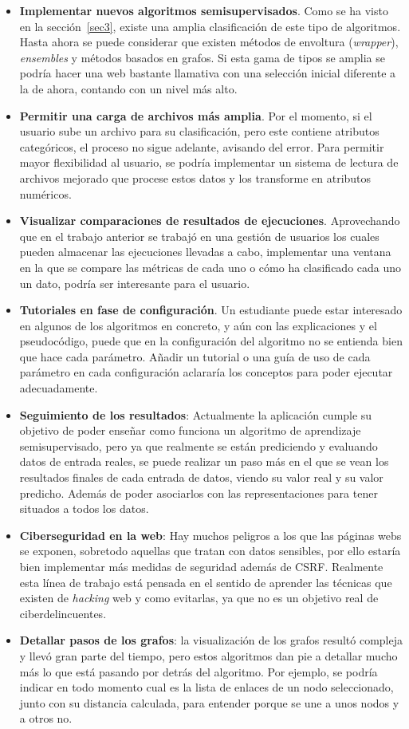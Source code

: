 \begin{itemize}
	\item \textbf{Implementar nuevos algoritmos semisupervisados}. Como se ha visto en la sección~\ref{sec3}, existe una amplia clasificación de este tipo de algoritmos. Hasta ahora se puede considerar que existen métodos de envoltura (\textit{wrapper}), \textit{ensembles} y métodos basados en grafos. Si esta gama de tipos se amplia se podría hacer una web bastante llamativa con una selección inicial diferente a la de ahora, contando con un nivel más alto.
	\item \textbf{Permitir una carga de archivos más amplia}. Por el momento, si el usuario sube un archivo para su clasificación, pero este contiene atributos categóricos, el proceso no sigue adelante, avisando del error. Para permitir mayor flexibilidad al usuario, se podría implementar un sistema de lectura de archivos mejorado que procese estos datos y los transforme en atributos numéricos.
	\item \textbf{Visualizar comparaciones de resultados de ejecuciones}. Aprovechando que en el trabajo anterior se trabajó en una gestión de usuarios los cuales pueden almacenar las ejecuciones llevadas a cabo, implementar una ventana en la que se compare las métricas de cada uno o cómo ha clasificado cada uno un dato, podría ser interesante para el usuario.
	\item \textbf{Tutoriales en fase de configuración}. Un estudiante puede estar interesado en algunos de los algoritmos en concreto, y aún con las explicaciones y el pseudocódigo, puede que en la configuración del algoritmo no se entienda bien que hace cada parámetro. Añadir un tutorial o una guía de uso de cada parámetro en cada configuración aclararía los conceptos para poder ejecutar adecuadamente.
	\item \textbf{Seguimiento de los resultados}: Actualmente la aplicación cumple su objetivo de poder enseñar como funciona un algoritmo de aprendizaje semisupervisado, pero ya que realmente se están prediciendo y evaluando datos de entrada reales, se puede realizar un paso más en el que se vean los resultados finales de cada entrada de datos, viendo su valor real y su valor predicho. Además de poder asociarlos con las representaciones para tener situados a todos los datos.
	\item \textbf{Ciberseguridad en la web}: Hay muchos peligros a los que las páginas webs se exponen, sobretodo aquellas que tratan con datos sensibles, por ello estaría bien implementar más medidas de seguridad además de CSRF. Realmente esta línea de trabajo está pensada en el sentido de aprender las técnicas que existen de \textit{hacking} web y como evitarlas, ya que no es un objetivo real de ciberdelincuentes.
	\item \textbf{Detallar pasos de los grafos}: la visualización de los grafos resultó compleja y llevó gran parte del tiempo, pero estos algoritmos dan pie a detallar mucho más lo que está pasando por detrás del algoritmo. Por ejemplo, se podría indicar en todo momento cual es la lista de enlaces de un nodo seleccionado, junto con su distancia calculada, para entender porque se une a unos nodos y a otros no.
\end{itemize}